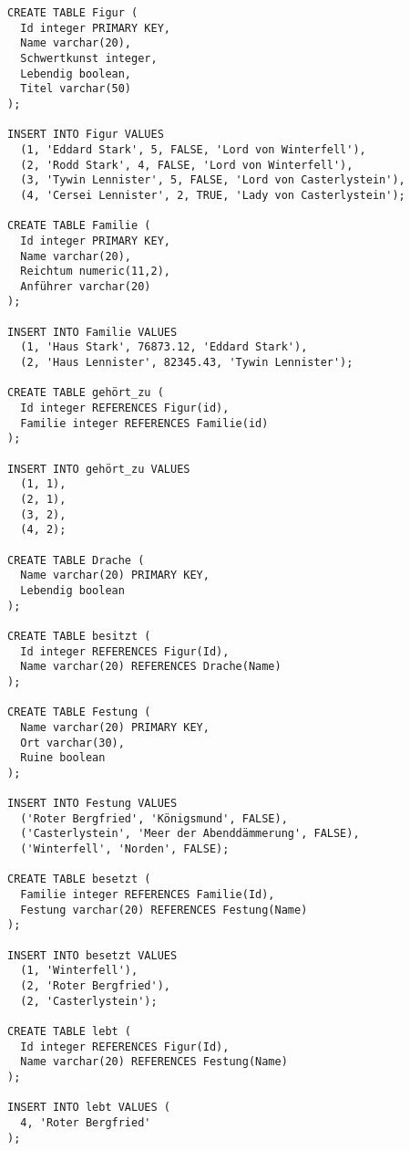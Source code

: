\documentclass{lehramt-informatik-aufgabe}
\begin{document}
\begin{verbatim}
CREATE TABLE Figur (
  Id integer PRIMARY KEY,
  Name varchar(20),
  Schwertkunst integer,
  Lebendig boolean,
  Titel varchar(50)
);

INSERT INTO Figur VALUES
  (1, 'Eddard Stark', 5, FALSE, 'Lord von Winterfell'),
  (2, 'Rodd Stark', 4, FALSE, 'Lord von Winterfell'),
  (3, 'Tywin Lennister', 5, FALSE, 'Lord von Casterlystein'),
  (4, 'Cersei Lennister', 2, TRUE, 'Lady von Casterlystein');

CREATE TABLE Familie (
  Id integer PRIMARY KEY,
  Name varchar(20),
  Reichtum numeric(11,2),
  Anführer varchar(20)
);

INSERT INTO Familie VALUES
  (1, 'Haus Stark', 76873.12, 'Eddard Stark'),
  (2, 'Haus Lennister', 82345.43, 'Tywin Lennister');

CREATE TABLE gehört_zu (
  Id integer REFERENCES Figur(id),
  Familie integer REFERENCES Familie(id)
);

INSERT INTO gehört_zu VALUES
  (1, 1),
  (2, 1),
  (3, 2),
  (4, 2);

CREATE TABLE Drache (
  Name varchar(20) PRIMARY KEY,
  Lebendig boolean
);

CREATE TABLE besitzt (
  Id integer REFERENCES Figur(Id),
  Name varchar(20) REFERENCES Drache(Name)
);

CREATE TABLE Festung (
  Name varchar(20) PRIMARY KEY,
  Ort varchar(30),
  Ruine boolean
);

INSERT INTO Festung VALUES
  ('Roter Bergfried', 'Königsmund', FALSE),
  ('Casterlystein', 'Meer der Abenddämmerung', FALSE),
  ('Winterfell', 'Norden', FALSE);

CREATE TABLE besetzt (
  Familie integer REFERENCES Familie(Id),
  Festung varchar(20) REFERENCES Festung(Name)
);

INSERT INTO besetzt VALUES
  (1, 'Winterfell'),
  (2, 'Roter Bergfried'),
  (2, 'Casterlystein');

CREATE TABLE lebt (
  Id integer REFERENCES Figur(Id),
  Name varchar(20) REFERENCES Festung(Name)
);

INSERT INTO lebt VALUES (
  4, 'Roter Bergfried'
);
\end{verbatim}
\end{document}
